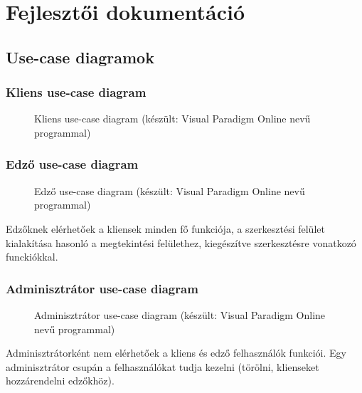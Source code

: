\chapter{Fejlesztői dokumentáció}
\label{ch:implementation}

\section{Use-case diagramok}

\subsection{Kliens use-case diagram}

\begin{figure}[H]
	\centering
	\caption{Kliens use-case diagram (készült: Visual Paradigm Online \cite{visualparadigm} nevű programmal)}
	\label{fig:usecaseclient}
\end{figure}

\subsection{Edző use-case diagram}

\begin{figure}[H]
	\centering
	\caption{Edző use-case diagram (készült: Visual Paradigm Online \cite{visualparadigm} nevű programmal)}
	\label{fig:usecasecoach}
\end{figure}

Edzőknek elérhetőek a kliensek minden fő funkciója, a szerkesztési felület kialakítása hasonló a megtekintési felülethez, kiegészítve szerkesztésre vonatkozó funckiókkal.

\subsection{Adminisztrátor use-case diagram}

\begin{figure}[H]
	\centering
	\caption{Adminisztrátor use-case diagram (készült: Visual Paradigm Online \cite{visualparadigm} nevű programmal)}
	\label{fig:usecaseadmin}
\end{figure}

Adminisztrátorként nem elérhetőek a kliens és edző felhasználók funkciói. Egy adminisztrátor csupán a felhasználókat tudja kezelni (törölni, klienseket hozzárendelni edzőkhöz).

